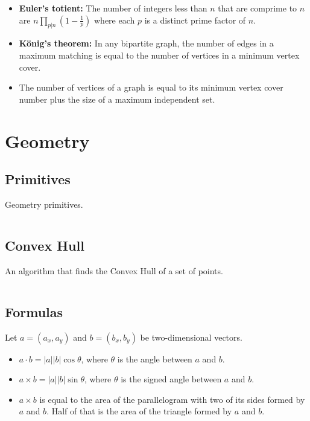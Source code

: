 \documentclass[9pt,a4paper,twocolumn,landscape,oneside]{amsart}
\newcommand{\code}[1]{\inputminted{cpp}{_code/#1}}
\begin{document}
\begin{itemize}
            \item \textbf{Euler's totient:} The number of integers less than
                $n$ that are comprime to $n$ are $n\prod_{p|n}\left(1 - \frac{1}{p}\right)$
                where each $p$ is a distinct prime factor of $n$.
            \item \textbf{König's theorem:} In any bipartite graph, the number
                of edges in a maximum matching is equal to the number of
                vertices in a minimum vertex cover.
            \item The number of vertices of a graph is equal to its minimum
                vertex cover number plus the size of a maximum independent set.
        \end{itemize}


\section{Geometry}
    \subsection{Primitives}
        Geometry primitives.
        \code{geometry/primitives.cpp}

    \subsection{Convex Hull}
        An algorithm that finds the Convex Hull of a set of points.
        \code{geometry/convex_hull.cpp}

    \subsection{Formulas}
        Let $a = (a_x, a_y)$ and $b = (b_x, b_y)$ be two-dimensional vectors.
        \begin{itemize}
            \item $a\cdot b = |a||b|\cos{\theta}$, where $\theta$ is the angle
                between $a$ and $b$.
            \item $a\times b = |a||b|\sin{\theta}$, where $\theta$ is the
                signed angle between $a$ and $b$.
            \item $a\times b$ is equal to the area of the parallelogram with
                two of its sides formed by $a$ and $b$. Half of that is the
                area of the triangle formed by $a$ and $b$.
        \end{itemize}
\end{document}
